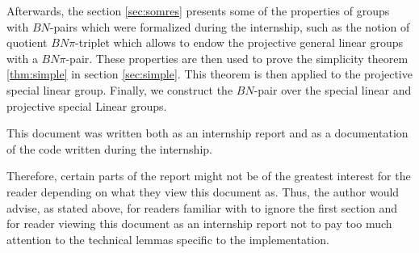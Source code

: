     Afterwards, the section \ref{sec:somres} presents some of the properties of groups with $BN$-pairs which were formalized during the internship, such as the notion of quotient $BN\pi$-triplet which allows to endow the projective general linear groups with a $BN\pi$-pair.
    These properties are then used to prove the simplicity theorem \ref{thm:simple} in section \ref{sec:simple}. This theorem is then applied to the projective special linear group. Finally, we construct the $BN$-pair over the special linear and projective special Linear groups.


 This document was written both as an internship report and as a documentation of the code written during the internship.

 Therefore, certain parts of the report might not be of the greatest interest for the reader depending on what they view this document as. Thus, the author would advise, as stated above, for readers familiar with \Lean to ignore the first section and for reader viewing this document as an internship report not to pay too much attention to the technical lemmas specific to the \Lean implementation.
